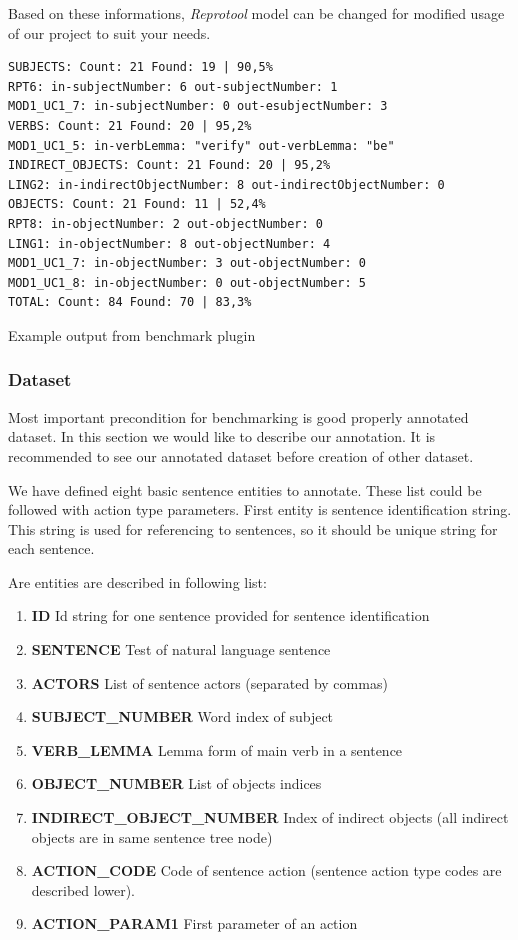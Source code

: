 Based on these informations, \emph{Reprotool} model can be changed for modified usage of our project to suit your needs.

\begin{table}[ht]   %
\begin{center}
    \begin{verbatim}
SUBJECTS: Count: 21 Found: 19 | 90,5%
RPT6: in-subjectNumber: 6 out-subjectNumber: 1
MOD1_UC1_7: in-subjectNumber: 0 out-esubjectNumber: 3
VERBS: Count: 21 Found: 20 | 95,2%
MOD1_UC1_5: in-verbLemma: "verify" out-verbLemma: "be"
INDIRECT_OBJECTS: Count: 21 Found: 20 | 95,2%
LING2: in-indirectObjectNumber: 8 out-indirectObjectNumber: 0
OBJECTS: Count: 21 Found: 11 | 52,4%
RPT8: in-objectNumber: 2 out-objectNumber: 0
LING1: in-objectNumber: 8 out-objectNumber: 4
MOD1_UC1_7: in-objectNumber: 3 out-objectNumber: 0
MOD1_UC1_8: in-objectNumber: 0 out-objectNumber: 5
TOTAL: Count: 84 Found: 70 | 83,3%   
    \end{verbatim}
  \caption{Example output from benchmark plugin}
  \label{tab.benchmarkexample}
\end{center}
\end{table}   
      
      
\subsubsection{Dataset}
\label{sec:dataset}
Most important precondition for benchmarking is good properly annotated dataset. In this section we would like to describe our annotation. It is recommended to see our annotated dataset before creation of other dataset.

We have defined eight basic sentence entities to annotate. These list could be followed with action type parameters. First entity is sentence identification string. This string is used for referencing to sentences, so it should be unique string for each sentence.

Are entities are described in following list:

\begin{enumerate}
\item {\bf ID } Id string for one sentence provided for sentence identification
\item {\bf SENTENCE } Test of natural language sentence
\item {\bf ACTORS } List of sentence actors (separated by commas)
\item {\bf SUBJECT\_NUMBER } Word index of subject
\item {\bf VERB\_LEMMA } Lemma form of main verb in a sentence
\item {\bf OBJECT\_NUMBER} List of objects indices
\item {\bf INDIRECT\_OBJECT\_NUMBER} Index of indirect objects (all indirect objects are in same sentence tree node)
\item {\bf ACTION\_CODE} Code of sentence action (sentence action type codes are described lower). 
\item {\bf ACTION\_PARAM1} First parameter of an action
\end{enumerate}   
   
